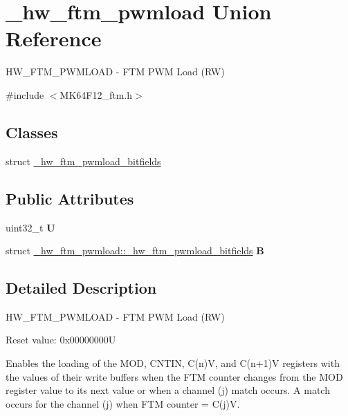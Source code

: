 \hypertarget{union__hw__ftm__pwmload}{}\section{\+\_\+hw\+\_\+ftm\+\_\+pwmload Union Reference}
\label{union__hw__ftm__pwmload}


H\+W\+\_\+\+F\+T\+M\+\_\+\+P\+W\+M\+L\+O\+AD -\/ F\+TM P\+WM Load (RW)  




{\ttfamily \#include $<$M\+K64\+F12\+\_\+ftm.\+h$>$}

\subsection*{Classes}
\begin{DoxyCompactItemize}
\item 
struct \hyperlink{struct__hw__ftm__pwmload_1_1__hw__ftm__pwmload__bitfields}{\+\_\+hw\+\_\+ftm\+\_\+pwmload\+\_\+bitfields}
\end{DoxyCompactItemize}
\subsection*{Public Attributes}
\begin{DoxyCompactItemize}
\item 
uint32\+\_\+t {\bfseries U}\hypertarget{union__hw__ftm__pwmload_a329ca883ec1cbe64ffb8e7d8fbb6d005}{}\label{union__hw__ftm__pwmload_a329ca883ec1cbe64ffb8e7d8fbb6d005}

\item 
struct \hyperlink{struct__hw__ftm__pwmload_1_1__hw__ftm__pwmload__bitfields}{\+\_\+hw\+\_\+ftm\+\_\+pwmload\+::\+\_\+hw\+\_\+ftm\+\_\+pwmload\+\_\+bitfields} {\bfseries B}\hypertarget{union__hw__ftm__pwmload_a98a736e10afe746ee50263a887adc416}{}\label{union__hw__ftm__pwmload_a98a736e10afe746ee50263a887adc416}

\end{DoxyCompactItemize}


\subsection{Detailed Description}
H\+W\+\_\+\+F\+T\+M\+\_\+\+P\+W\+M\+L\+O\+AD -\/ F\+TM P\+WM Load (RW) 

Reset value\+: 0x00000000U

Enables the loading of the M\+OD, C\+N\+T\+IN, C(n)V, and C(n+1)V registers with the values of their write buffers when the F\+TM counter changes from the M\+OD register value to its next value or when a channel (j) match occurs. A match occurs for the channel (j) when F\+TM counter = C(j)V. 

